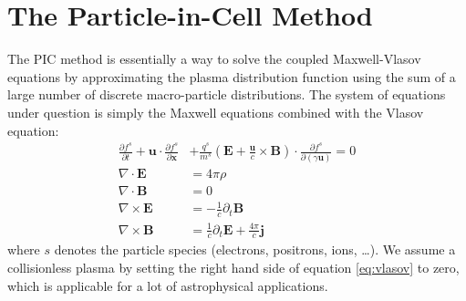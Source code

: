 \section{The Particle-in-Cell Method}
\label{sec:particle-cell-method}
The PIC method is essentially a way to solve the coupled Maxwell-Vlasov
equations by approximating the plasma distribution function using the
sum of a large number of discrete macro-particle distributions. The
system of equations under question is simply the Maxwell equations
combined with the Vlasov equation:
\begin{align}
    \frac{\partial f^{s}}{\partial t} + \mathbf{u}\cdot\frac{\partial f^s}{\partial \mathbf{x}} &+ \frac{q^s}{m^s}\left(\mathbf{E} + \frac{\mathbf{u}}{c}\times \mathbf{B}\right)\cdot\frac{\partial f^s}{\partial (\gamma \mathbf{u})} = 0 \label{eq:vlasov}\\
    \nabla\cdot \mathbf{E} &= 4\pi\rho \\
    \nabla\cdot \mathbf{B} &= 0 \\
    \nabla\times \mathbf{E} &= -\frac{1}{c}\partial_t \mathbf{B} \\
    \nabla\times \mathbf{B} &= \frac{1}{c}\partial_t \mathbf{E} + \frac{4\pi}{c} \mathbf{j}
\end{align}
where $s$ denotes the particle species (electrons, positrons, ions,
\dots). We assume a collisionless plasma by setting the right hand
side of equation \eqref{eq:vlasov} to zero, which is applicable for a lot of
astrophysical applications.

